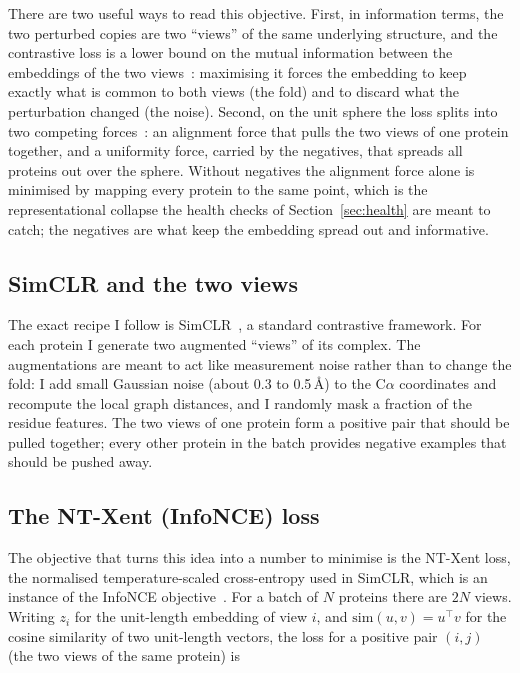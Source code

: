 \documentclass[11pt,a4paper]{article}
\theoremstyle{definition}
\begin{document}
There are two useful ways to read this objective. First, in information terms, the
two perturbed copies are two ``views'' of the same underlying structure, and the
contrastive loss is a lower bound on the mutual information between the embeddings
of the two views~\cite{infonce}: maximising it forces the embedding to keep
exactly what is common to both views (the fold) and to discard what the
perturbation changed (the noise). Second, on the unit sphere the loss splits into
two competing forces~\cite{alignunif}: an alignment force that pulls the two views
of one protein together, and a uniformity force, carried by the negatives, that
spreads all proteins out over the sphere. Without negatives the alignment force
alone is minimised by mapping every protein to the same point, which is the
representational collapse the health checks of Section~\ref{sec:health} are meant
to catch; the negatives are what keep the embedding spread out and informative.

\subsection{SimCLR and the two views}

The exact recipe I follow is SimCLR~\cite{simclr}, a standard contrastive
framework. For each protein I generate two augmented ``views'' of its complex.
The augmentations are meant to act like measurement noise rather than to change
the fold: I add small Gaussian noise (about 0.3 to 0.5\,\AA) to the C$\alpha$
coordinates and recompute the local graph distances, and I randomly mask a
fraction of the residue features. The two views of one protein form a positive
pair that should be pulled together; every other protein in the batch provides
negative examples that should be pushed away.

\subsection{The NT-Xent (InfoNCE) loss}

The objective that turns this idea into a number to minimise is the NT-Xent loss,
the normalised temperature-scaled cross-entropy used in SimCLR, which is an
instance of the InfoNCE objective~\cite{infonce,simclr}. For a batch of $N$
proteins there are $2N$ views. Writing $z_i$ for the unit-length embedding of view
$i$, and $\mathrm{sim}(u,v)=u^{\top}v$ for the cosine similarity of two
unit-length vectors, the loss for a positive pair $(i,j)$ (the two views of the
same protein) is
\end{document}
